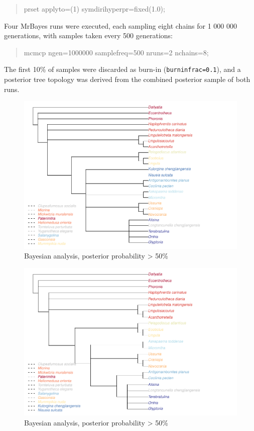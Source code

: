 \documentclass[]{book}
\theoremstyle{definition}
\theoremstyle{definition}
\theoremstyle{definition}
\theoremstyle{remark}
\begin{document}
\begin{quote}
prset applyto=(1) symdirihyperpr=fixed(1.0);
\end{quote}

Four MrBayes runs were executed, each sampling eight chains for 1 000
000 generations, with samples taken every 500 generations:

\begin{quote}
mcmcp ngen=1000000 samplefreq=500 nruns=2 nchains=8;
\end{quote}

The first 10\% of samples were discarded as burn-in
(\texttt{burninfrac=0.1}), and a posterior tree topology was derived
from the combined posterior sample of both runs.

\begin{figure}
\centering
\includegraphics{Brachiopod_phylogeny_files/figure-latex/unnamed-chunk-11-1.pdf}
\caption{\label{fig:unnamed-chunk-11}Bayesian analysis, posterior
probability \textgreater{} 50\%}
\end{figure}

\begin{figure}
\centering
\includegraphics{Brachiopod_phylogeny_files/figure-latex/unnamed-chunk-12-1.pdf}
\caption{\label{fig:unnamed-chunk-12}Bayesian analysis, posterior
probability \textgreater{} 50\%}
\end{figure}
\end{document}
